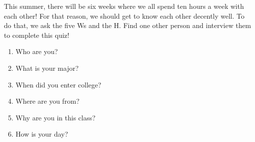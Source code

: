 \documentclass[letterpaper,11pt]{article}
\begin{document}

This summer, there will be six weeks where we all spend ten hours a week with each other! For that reason, we should get to know each other decently well. To do that, we ask the five Ws and the H. Find one other person and interview them to complete this quiz!
\begin{enumerate}
\item Who are you?
\vfill
\item What is your major?
\vfill
\item When did you enter college?
\vfill
\item Where are you from?
\vfill
\item Why are you in this class?
\vfill
\item How is your day?
\vfill
\end{enumerate}
\end{document}
